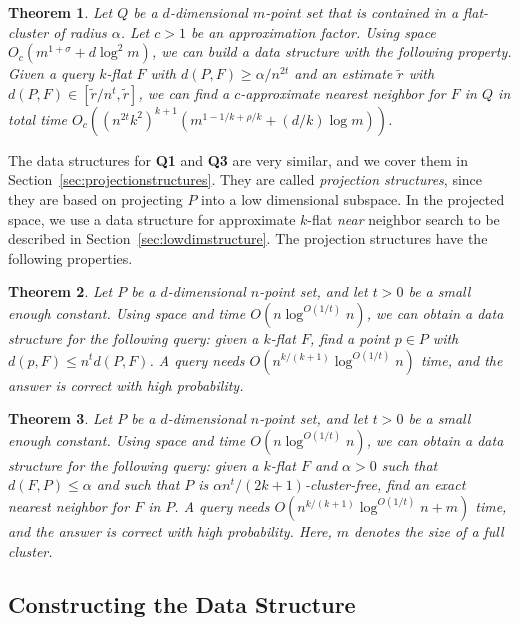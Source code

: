 \documentclass[a4paper,11pt]{paper}
\newtheorem{theorem} {Theorem}[section]
\begin{document}
\begin{theorem}\label{thm:q2}
  Let $Q$ be a $d$-dimensional $m$-point set
  that is contained in a flat-cluster of radius $\alpha$.
  Let $c > 1$ be an approximation factor.
  Using space
  $O_c(m^{1+\sigma} + d\log^2 m)$, we can build a data
  structure with the following property.
  Given a query $k$-flat $F$ with $d(P, F) \geq \alpha/n^{2t}$
  and an estimate $\widetilde{r}$ with
  $d(P, F) \in [\widetilde{r}/n^t, \widetilde{r}]$,
  we can find
  a $c$-approximate nearest neighbor for $F$ in $Q$ in total
  time
  $O_c((n^{2t}k^2)^{k+1}(m^{1-1/k+\rho/k} + (d/k)\log m))$.
\end{theorem}
The data structures for \textbf{Q1} and \textbf{Q3} are very similar,
and we cover them in Section~\ref{sec:projectionstructures}.
They are called \emph{projection structures}, since
they are based on projecting $P$ into a low dimensional
subspace.
In the projected space, we use a
data structure for approximate $k$-flat \textit{near}
neighbor search to be described in
Section~\ref{sec:lowdimstructure}.
The projection structures have the following properties.
\begin{theorem}
 \label{thm:q1}
 Let $P$ be a $d$-dimensional $n$-point set, and let $t > 0$ be
 a small enough constant.
Using space and time $O(n \log^{O(1/t)}n)$, we can obtain
a data structure for the following query:
given a $k$-flat $F$, find a point $p \in P$ with
$d(p, F) \leq n^td(P, F)$.
A query needs $O(n^{k/(k+1)}\log^{O(1/t)} n)$ time, and
the answer is correct with high probability.
\end{theorem}

\begin{theorem}
 \label{thm:q3}
 Let $P$ be a $d$-dimensional $n$-point set, and let $t > 0$ be
 a small enough constant.
Using space and time $O(n \log^{O(1/t)}n)$, we can obtain
a data structure for the following query:
given a $k$-flat $F$ and $\alpha > 0$ such that
$d(F, P) \leq \alpha$ and such that $P$ is
$\alpha n^t/(2k+1)$-cluster-free, find an exact nearest neighbor for
$F$ in $P$. A query needs $O(n^{k/(k+1)}\log^{O(1/t)}n + m)$
time, and the answer is correct with high probability.
Here, $m$ denotes the size of a full cluster.
\end{theorem}

\subsection{Constructing the Data Structure}
\end{document}
